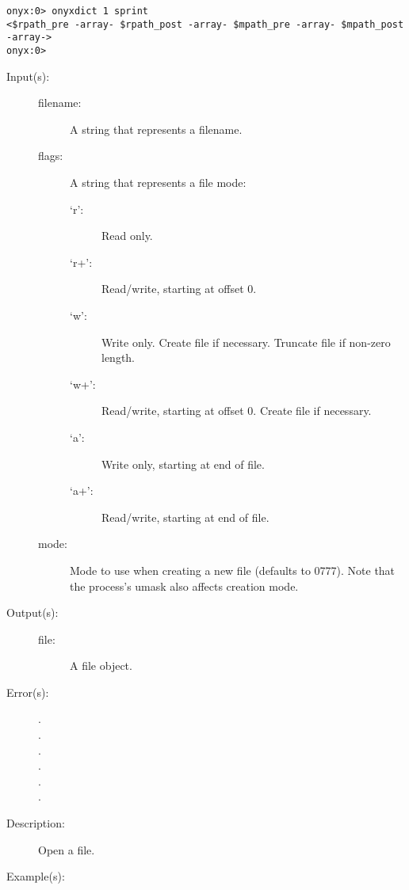 \begin{description}
\begin{description}
\begin{verbatim}
onyx:0> onyxdict 1 sprint
<$rpath_pre -array- $rpath_post -array- $mpath_pre -array- $mpath_post -array->
onyx:0>
		\end{verbatim}
	\end{description}
\label{systemdict:open}
\item[{\onyxop{filename flags}{open}{file}}: ]
\item[{\onyxop{filename flags mode}{open}{file}}: ]
	\begin{description}\item[]
	\item[Input(s): ]
		\begin{description}\item[]
		\item[filename: ]
			A string that represents a filename.
		\item[flags: ]
			A string that represents a file mode:
			\begin{description}%
			\item[`r': ]
				Read only.
			\item[`r+': ]
				Read/write, starting at offset 0.
			\item[`w': ]
				Write only.  Create file if necessary.  Truncate
				file if non-zero length.
			\item[`w+': ]
				Read/write, starting at offset 0.  Create
				file if necessary.
			\item[`a': ]
				Write only, starting at end of file.
			\item[`a+': ]
				Read/write, starting at end of file.
			\end{description}
		\item[mode: ]
			Mode to use when creating a new file (defaults to 0777).
			Note that the process's umask also affects creation
			mode.
		\end{description}
	\item[Output(s): ]
		\begin{description}\item[]
		\item[file: ]
			A file object.
		\end{description}
	\item[Error(s): ]
		\begin{description}\item[]
		\item[.]
		\item[.]
		\item[.]
		\item[.]
		\item[.]
		\item[.]
		\end{description}
	\item[Description: ]
		Open a file.
	\item[Example(s): ]\begin{verbatim}


\end{verbatim}
\end{description}
\end{description}
